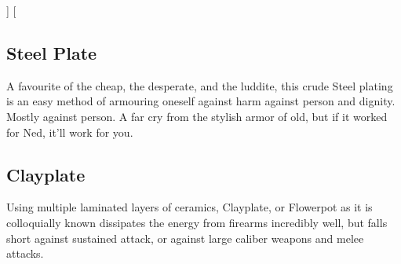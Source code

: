 \documentclass[a4paper, twocolumn, openany]{book}
\begin{document}
{{	
}]
\twocolumn[{
	\setlength{\parindent}{10.00002pt}

	\subsection{Steel Plate}
	A favourite of the cheap, the desperate, and the luddite, this crude Steel plating is an easy
	method of armouring oneself against harm against person and dignity. Mostly against person. A
	far cry from the stylish armor of old, but if it worked for Ned, it’ll work for you.\\


	\subsection{Clayplate}
	Using multiple laminated layers of ceramics, Clayplate, or Flowerpot as it is colloquially known
	dissipates the energy from firearms incredibly well, but falls short against sustained attack, or
	against large caliber weapons and melee attacks.\\

}}
\end{document}
